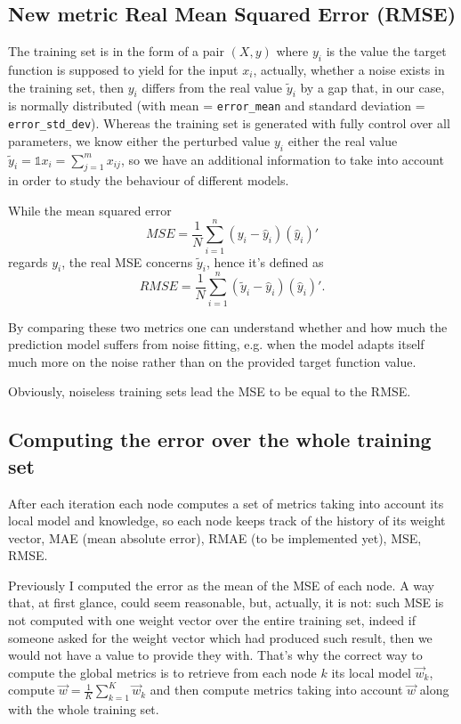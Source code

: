 \documentclass[11pt]{article}
\begin{document}
    \subsection{New metric Real Mean Squared Error
(RMSE)}\label{new-metric-real-mean-squared-error-rmse}

The training set is in the form of a pair \((X,y)\) where \(y_i\) is the
value the target function is supposed to yield for the input \(x_i\),
actually, whether a noise exists in the training set, then \(y_i\)
differs from the real value \(\tilde{y}_i\) by a gap that, in our case,
is normally distributed (with mean = \texttt{error\_mean} and standard
deviation = \texttt{error\_std\_dev}). Whereas the training set is
generated with fully control over all parameters, we know either the
perturbed value \(y_i\) either the real value
\(\tilde{y}_i=\mathbb{1} x_i=\sum_{j=1}^{m}x_{ij}\), so we have an
additional information to take into account in order to study the
behaviour of different models.

While the mean squared error
\[MSE = \frac{1}{N} \sum_{i=1}^{n} (y_i - \hat{y}_i) (\hat{y}_i)'\]
regards \(y_i\), the real MSE concerns \(\tilde{y}_i\), hence it's
defined as
\[RMSE = \frac{1}{N} \sum_{i=1}^{n} (\tilde{y}_i - \hat{y}_i) (\hat{y}_i)'.\]

By comparing these two metrics one can understand whether and how much
the prediction model suffers from noise fitting, e.g. when the model
adapts itself much more on the noise rather than on the provided target
function value.

Obviously, noiseless training sets lead the MSE to be equal to the RMSE.

    \subsection{Computing the error over the whole training
set}\label{computing-the-error-over-the-whole-training-set}

After each iteration each node computes a set of metrics taking into
account its local model and knowledge, so each node keeps track of the
history of its weight vector, MAE (mean absolute error), RMAE (to be
implemented yet), MSE, RMSE.

Previously I computed the error as the mean of the MSE of each node. A
way that, at first glance, could seem reasonable, but, actually, it is
not: such MSE is not computed with one weight vector over the entire
training set, indeed if someone asked for the weight vector which had
produced such result, then we would not have a value to provide they
with. That's why the correct way to compute the global metrics is to
retrieve from each node \(k\) its local model \(\vec{w}_{k}\), compute
\(\vec{w} = \frac{1}{K}\sum_{k=1}^{K}\vec{w}_k\) and then compute
metrics taking into account \(\vec{w}\) along with the whole training
set.
\end{document}

